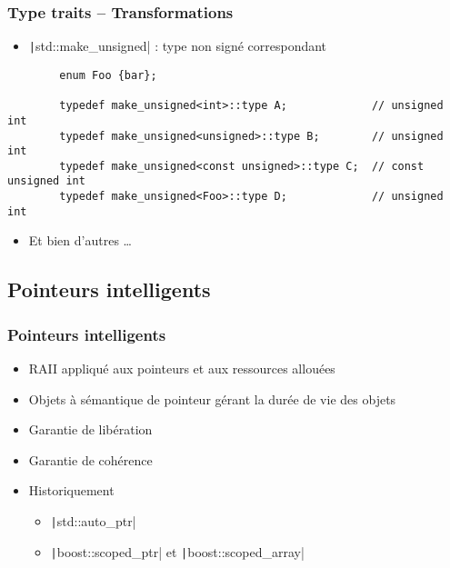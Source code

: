 \documentclass[C++.tex]{subfiles}
\begin{document}
\begin{frame}[fragile]
	\frametitle{Type traits -- Transformations}
	\begin{itemize}
		\item \texttt|std::make_unsigned| : type non signé correspondant
	\end{itemize}

	\begin{verbatim}
		enum Foo {bar};

		typedef make_unsigned<int>::type A;             // unsigned int
		typedef make_unsigned<unsigned>::type B;        // unsigned int
		typedef make_unsigned<const unsigned>::type C;  // const unsigned int
		typedef make_unsigned<Foo>::type D;             // unsigned int
	\end{verbatim}

	\begin{itemize}
		\item Et bien d'autres \ldots{}
	\end{itemize}
\end{frame}

\subsection*{Pointeurs intelligents}
\begin{frame}[fragile]
	\frametitle{Pointeurs intelligents}
	\begin{itemize}
		\item RAII appliqué aux pointeurs et aux ressources allouées
		\item Objets à sémantique de pointeur gérant la durée de vie des objets
		\item Garantie de libération
		\item Garantie de cohérence
		\item Historiquement
		\begin{itemize}
			\item \texttt|std::auto_ptr|
			\item \texttt|boost::scoped_ptr| et \texttt|boost::scoped_array|
		\end{itemize}
	\end{itemize}
\end{frame}
\end{document}
